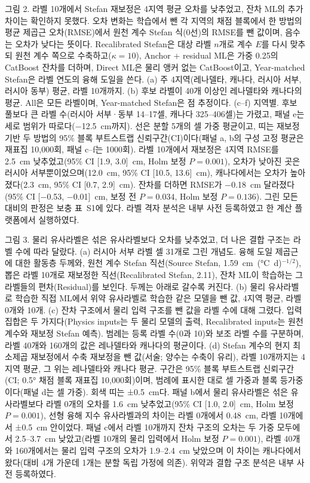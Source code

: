 \medskip

\noindent 그림 2. 라벨 10개에서 Stefan 재보정은 4지역 평균 오차를 낮추었고, 잔차 ML의 추가 차이는 확인하지 못했다.
오차 변화는 학습에서 뺀 각 지역의 채점 블록에서 한 방법의 평균 제곱근 오차(RMSE)에서 원천 계수 Stefan 식(0선)의 RMSE를 뺀 값이며, 음수는 오차가 낮다는 뜻이다.
Recalibrated Stefan은 대상 라벨 $n$개로 계수 $E$를 다시 맞추되 원천 계수 쪽으로 수축하고($\kappa = 10$), Anchor + residual ML은 가중 0.25의 CatBoost 잔차를 더하며, Direct ML은 물리 앵커 없는 CatBoost이고, Year-matched Stefan은 라벨 연도의 융해 도일을 쓴다.
(a) 주 4지역(레나델타, 캐나다, 러시아 서부, 러시아 동부) 평균, 라벨 10개까지.
(b) 후보 라벨이 40개 이상인 레나델타와 캐나다의 평균. All은 모든 라벨이며, Year-matched Stefan은 점 추정이다.
(c--f) 지역별. 후보 풀보다 큰 라벨 수(러시아 서부·동부 14--17셀, 캐나다 325--406셀)는 가렸고, 패널 e는 세로 범위가 따로다(−12.5~cm까지).
선은 분할 5개의 셀 가중 평균이고, 띠는 재보정 기반 두 방법의 95\% 블록 부트스트랩 신뢰구간(CI)이다(패널 a, b의 구성 고정 평균은 재표집 10,000회, 패널 c--f는 1000회).
라벨 10개에서 재보정은 4지역 RMSE를 2.5~cm 낮추었고(95\% CI [1.9, 3.0]~cm, Holm 보정 $P = 0.001$), 오차가 낮아진 곳은 러시아 서부뿐이었으며(12.0~cm, 95\% CI [10.5, 13.6]~cm), 캐나다에서는 오차가 높아졌다(2.3~cm, 95\% CI [0.7, 2.9]~cm). 잔차를 더하면 RMSE가 −0.18~cm 달라졌다(95\% CI [−0.53, −0.01]~cm, 보정 전 $P = 0.034$, Holm 보정 $P = 0.136$).
그린 모든 대비의 판정은 보충 표~S1에 있다.
라벨 격자 분석은 내부 사전 등록하였고 한 계산 플랫폼에서 실행하였다.

\medskip

\noindent 그림 3. 물리 유사라벨은 섞은 유사라벨보다 오차를 낮추었고, 더 나은 결합 구조는 라벨 수에 따라 달랐다.
(a) 러시아 서부 라벨 셀 31개로 그린 개념도. 융해 도일 제곱근에 대한 활동층 두께와, 원천 계수 Stefan 직선(Source Stefan, 1.59~cm~(°C~d)$^{-1/2}$), 뽑은 라벨 10개로 재보정한 직선(Recalibrated Stefan, 2.11), 잔차 ML이 학습하는 그 라벨들의 편차(Residual)를 보인다. 두께는 아래로 갈수록 커진다.
(b) 물리 유사라벨로 학습한 직접 ML에서 위약 유사라벨로 학습한 같은 모델을 뺀 값, 4지역 평균, 라벨 0개와 10개.
(c) 잔차 구조에서 물리 입력 구조를 뺀 값을 라벨 수에 대해 그렸다. 입력 집합은 두 가지다(Physics inputs는 두 물리 모델의 출력, Recalibrated inputs는 원천 계수와 재보정 Stefan 예측). 범례는 등록 라벨 수(0과 10)와 보조 라벨 수를 구분하며, 라벨 40개와 160개의 값은 레나델타와 캐나다의 평균이다.
(d) Stefan 계수의 현지 최소제곱 재보정에서 수축 재보정을 뺀 값(서술; 양수는 수축이 유리), 라벨 10개까지는 4지역 평균, 그 위는 레나델타와 캐나다 평균.
구간은 95\% 블록 부트스트랩 신뢰구간(CI; 0.5° 채점 블록 재표집 10,000회)이며, 범례에 표시한 대로 셀 가중과 블록 등가중이다(패널 d는 셀 가중). 회색 띠는 ±0.5~cm다.
패널 b에서 물리 유사라벨은 섞은 유사라벨보다 라벨 0개의 오차를 1.6~cm 낮추었고(95\% CI [1.0, 2.0]~cm, Holm 보정 $P = 0.001$), 선형 융해 지수 유사라벨과의 차이는 라벨 0개에서 0.48~cm, 라벨 10개에서 ±0.5~cm 안이었다.
패널 c에서 라벨 10개까지 잔차 구조의 오차는 두 가중 모두에서 2.5--3.7~cm 낮았고(라벨 10개의 물리 입력에서 Holm 보정 $P = 0.001$), 라벨 40개와 160개에서는 물리 입력 구조의 오차가 1.9--2.4~cm 낮았으며 이 차이는 캐나다에서 왔다(대비 4개 가운데 1개는 분할 독립 가정에 의존).
위약과 결합 구조 분석은 내부 사전 등록하였다.

